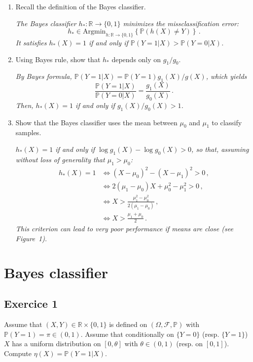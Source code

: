 \documentclass[a4paper,10pt,fleqn]{article}
\newcommand{\eqsp}{\,}
\newcommand{\rset}{\ensuremath{\mathbb{R}}}
\newcommand{\bP}{\mathbb{P}}
\newcommand{\1}{\ensuremath{\mathbbm{1}}}
\begin{document}
\begin{enumerate}
\item Recall the definition of the Bayes classifier.

\vspace{.2cm}

{\em The Bayes classifier $h_*: \mathbb{R}\to \{0,1\}$ minimizes the missclassification error:
$$
h_{*} \in \mathrm{Argmin}_{h:\rset\to \{0,1\}}\left\{\bP(h(X)\neq Y)\right\}\eqsp.
$$
It satisfies $h_{*}(X) = 1$ if and only if $\bP(Y=1|X)> \bP(Y=0|X)$.}

\item Using Bayes rule, show that  $h_*$ depends only on $g_1/g_0$.

\vspace{.2cm}

{\em  By Bayes formula, $\bP(Y=1|X) = \bP(Y=1)g_1(X)/g(X)$, which yields
$$
\frac{\bP(Y=1|X)}{\bP(Y=0|X)} = \frac{g_1(X)}{g_0(X)}\eqsp.
$$
Then, $h_*(X) = 1$ if and only if $g_1(X)/g_0(X)>1$.
}

\item Show that the Bayes classifier uses the mean between  $\mu_0$ and  $\mu_1$ to classify samples.

\vspace{.2cm}

{\em $h_*(X) = 1$ if and only if  $\log g_1(X) - \log g_0(X)>0$, so that, assuming without loss of generality that $\mu_1>\mu_0$:
\begin{align*}
h_*(X) = 1 & \Leftrightarrow (X-\mu_0)^2 - (X-\mu_1)^2>0\,,\\
& \Leftrightarrow 2 (\mu_1-\mu_0)X + \mu_0^2 - \mu_1^2>0\,,\\
&\Leftrightarrow X> \frac{\mu_1^2 - \mu_0^2}{2(\mu_1-\mu_0)}\,,\\
& \Leftrightarrow X> \frac{\mu_1 + \mu_0}{2}\eqsp.
\end{align*}
This criterion can lead to very poor performance if means are close (see Figure~1).}
\end{enumerate}



\section{Bayes classifier}
\subsection{Exercice 1}
Assume that $(X,Y)\in\mathbb{R}\times\{0,1\}$ is defined on $(\Omega,\mathcal{F},\mathbb{P})$ with $\mathbb{P}(Y=1) = \pi \in(0,1)$.  Assume that conditionally on $\{Y=0\}$ (resp. $\{Y=1\}$) $X$ has a uniform distribution on $[0,\theta]$ with $\theta\in(0,1)$ (resp. on $[0,1]$). Compute $\eta(X) = \mathbb{P}(Y=1 |X)$.
\end{document}
